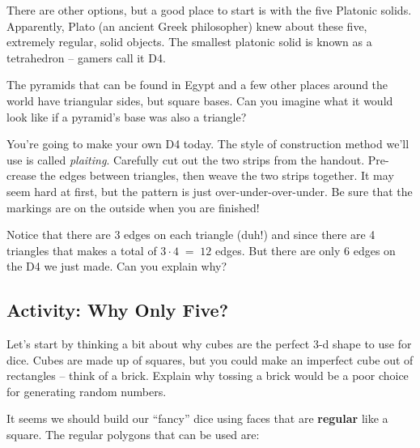 There are other options, but a good place to start is with the five Platonic solids.  Apparently, Plato (an ancient Greek philosopher) knew about these five, extremely regular, solid objects.  The smallest platonic solid is known as a tetrahedron -- gamers call it D4.  

The pyramids that can be found in Egypt and a few other places around the world have triangular sides, but square bases.  Can you imagine what it would look like if a pyramid's base was also a triangle?  

You're going to make your own D4 today. The style of construction method we'll use is called {\em plaiting}.  Carefully cut out the two strips from the handout.  Pre-crease the edges between triangles, then weave the two strips together.  It may seem hard at first, but the pattern is just over-under-over-under.  Be sure that the markings are on the outside when you are finished!

\vspace{.5in}

Notice that there are 3 edges on each triangle (duh!) and since there are 4 triangles that makes a total of $3 \cdot 4 \; = \; 12$ edges.  But there are only 6 edges on the D4 we just made.  Can you explain why?

\wbvfill

\newpage

\subsection{Activity: Why Only Five?}


Let's start by thinking a bit about why cubes are the perfect 3-d shape to use for dice.  Cubes are made up of squares, but you could make an imperfect cube out of rectangles -- think of a brick.  Explain why tossing a brick would be a poor choice for generating random numbers.

\vspace{1in}

It seems we should build our ``fancy'' dice using faces that are {\bf regular} like a square.  The regular polygons that can be used are:

